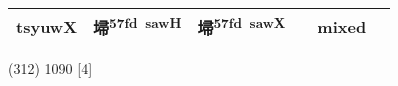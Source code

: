 \documentclass[14pt,a4paper]{scrartcl}
\begin{document}
\begin{longtable}[c]{@{}llllll@{}}
\begin{minipage}[t]{0.14\columnwidth}
tsyuwX
\strut\end{minipage} &
\begin{minipage}[t]{0.14\columnwidth}\raggedright\strut
埽\textsuperscript{57fd~sawH}
\strut\end{minipage} &
\begin{minipage}[t]{0.14\columnwidth}\raggedright\strut
埽\textsuperscript{57fd~sawX}
\strut\end{minipage} &
\begin{minipage}[t]{0.14\columnwidth}\raggedright\strut
\strut\end{minipage} &
\begin{minipage}[t]{0.14\columnwidth}\raggedright\strut
mixed
\strut\end{minipage}\tabularnewline
\bottomrule
\end{longtable}

(312) 1090 {[}4{]}
\end{document}
